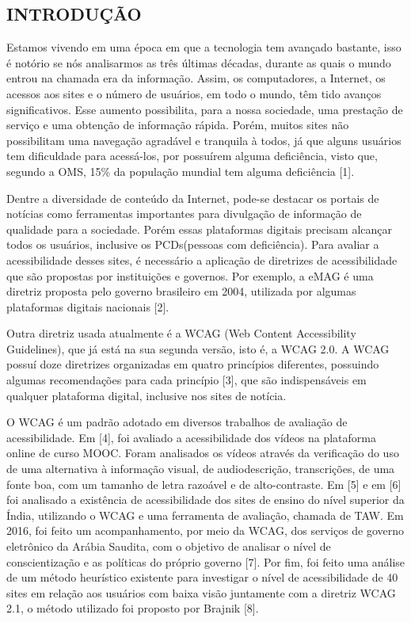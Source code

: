 \documentclass[a4paper]{article}
\begin{document}
\begin{titlepage}
	\begin{center}
		\tableofcontents
	\end{center}
\end{titlepage}
\begin{titlepage}
\section{INTRODUÇÃO}
\fontsize{12pt}{0pt}\selectfont
\onehalfspacing
Estamos vivendo em uma época em que a tecnologia tem avançado bastante, isso é notório se nós analisarmos as três últimas décadas, durante as quais o mundo entrou na chamada era da informação. Assim, os computadores, a Internet, os acessos aos sites e o número de usuários, em todo o mundo, têm tido avanços significativos. Esse aumento possibilita, para a nossa sociedade, uma prestação de serviço e uma obtenção de informação rápida. Porém, muitos sites não possibilitam uma navegação agradável e tranquila à todos, já que alguns usuários tem dificuldade para acessá-los, por possuírem alguma deficiência, visto que, segundo a OMS, 15\% da população mundial tem alguma deficiência [1].

Dentre a diversidade de conteúdo da Internet, pode-se destacar os portais de notícias como ferramentas importantes para divulgação de informação de qualidade para a sociedade. Porém essas plataformas digitais precisam alcançar todos os usuários, inclusive os PCDs(pessoas com deficiência). Para avaliar a acessibilidade desses sites, é necessário a aplicação de diretrizes de acessibilidade que são propostas por instituições e governos. Por exemplo, a eMAG é uma diretriz proposta pelo governo brasileiro em 2004, utilizada por algumas plataformas digitais nacionais [2].

Outra diretriz usada atualmente é a WCAG (Web Content Accessibility Guidelines), que já está na sua segunda versão, isto é, a WCAG 2.0. A WCAG possuí doze diretrizes organizadas em quatro princípios diferentes, possuindo algumas recomendações para cada princípio [3], que são indispensáveis em qualquer plataforma digital, inclusive nos sites de notícia.

O WCAG é um padrão adotado em diversos trabalhos de avaliação de acessibilidade. Em [4], foi avaliado a acessibilidade dos vídeos na plataforma online de curso MOOC. Foram analisados os vídeos através da verificação do uso de uma alternativa à informação visual, de audiodescrição, transcrições, de uma fonte boa, com um tamanho de letra razoável e de alto-contraste. Em [5] e em [6] foi analisado a existência de acessibilidade dos sites de ensino do nível superior da Índia, utilizando o WCAG e uma ferramenta de avaliação, chamada de TAW. Em 2016, foi feito um acompanhamento, por meio da WCAG, dos serviços de governo eletrônico da Arábia Saudita, com o objetivo de analisar o nível de conscientização e as políticas do próprio governo [7]. Por fim, foi feito uma análise de um método heurístico existente para investigar o nível de acessibilidade de 40 sites em relação aos usuários com baixa visão juntamente com a diretriz WCAG 2.1, o método utilizado foi proposto por Brajnik [8].


\end{titlepage}
\end{document}

